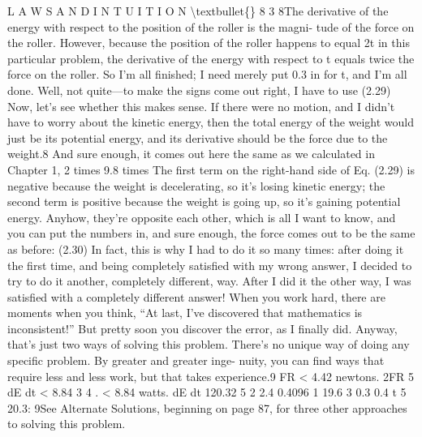 \documentclass[10pt,oneside]{article}
\begin{document}
L A W S  A N D  I N T U I T I O N \textbackslash{}textbullet\{\} 8 3 8The derivative of the energy with respect to the position of the roller is the magni- tude of the force on the roller. However, because the position of the roller happens to equal 2t in this particular problem, the derivative of the energy with respect to t equals twice the force on the roller. So I’m all finished; I need merely put 0.3 in for t, and I’m all done. Well, not quite---to make the signs come out right, I have to use (2.29) Now, let’s see whether this makes sense. If there were no motion, and I didn’t have to worry about the kinetic energy, then the total energy of the weight would just be its potential energy, and its derivative should be the force due to the weight.8 And sure enough, it comes out here the same as we calculated in Chapter 1, 2 times 9.8 times The first term on the right-hand side of Eq. (2.29) is negative because the weight is decelerating, so it’s losing kinetic energy; the second term is positive because the weight is going up, so it’s gaining potential energy. Anyhow, they’re opposite each other, which is all I want to know, and you can put the numbers in, and sure enough, the force comes out to be the same as before: (2.30) In fact, this is why I had to do it so many times: after doing it the first time, and being completely satisfied with my wrong answer, I decided to try to do it another, completely different, way. After I did it the other way, I was satisfied with a completely different answer! When you work hard, there are moments when you think, “At last, I’ve discovered that mathematics is inconsistent!” But pretty soon you discover the error, as I finally did. Anyway, that’s just two ways of solving this problem. There’s no unique way of doing any specific problem. By greater and greater inge- nuity, you can find ways that require less and less work, but that takes experience.9 FR < 4.42 newtons. 2FR 5 dE dt < 8.84 3 4 . < 8.84 watts. dE dt 120.32 5 2 2.4 0.4096 1 19.6 3 0.3 0.4 t 5 20.3: 9See Alternate Solutions, beginning on page 87, for three other approaches to solving this problem.\par
\end{document}

